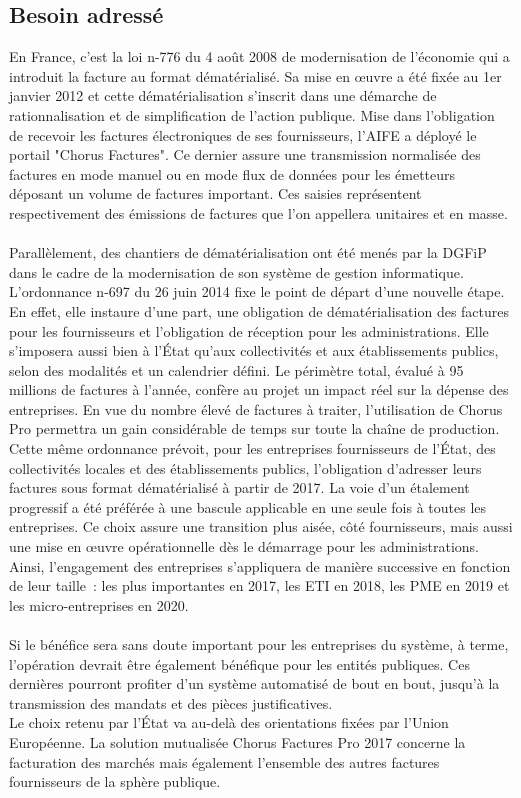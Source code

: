 \documentclass[12pt,a4paper]{article}
\begin{document}
\subsection{Besoin adressé}
En France, c'est la loi n-776 du 4 août 2008 de modernisation de l'économie qui a introduit la facture au format dématérialisé. Sa mise en œuvre a été fixée au 1er janvier 2012 et cette dématérialisation s’inscrit dans une démarche de rationnalisation et de simplification de l’action publique. Mise dans l'obligation de recevoir les factures électroniques de ses fournisseurs, l'AIFE a déployé le portail "Chorus Factures". Ce dernier assure une transmission normalisée des factures en mode manuel ou en mode flux de données pour les émetteurs déposant un volume de factures important. Ces saisies représentent respectivement des émissions de factures que l'on appellera unitaires et en masse.\\\\
Parallèlement, des chantiers de dématérialisation ont été menés par la \gls{DGFiP} dans le cadre de la modernisation de son système de gestion informatique.
L’ordonnance n-697 du 26 juin 2014 fixe le
point de départ d’une nouvelle étape. En effet, elle instaure d'une part, une obligation de dématérialisation des factures pour les fournisseurs et l'obligation de réception pour les administrations. Elle s'imposera aussi bien à l'État qu'aux collectivités et aux établissements publics, selon des modalités et un calendrier défini.
\smallbreak
Le périmètre total, évalué à 95 millions de factures à l'année, confère au projet un impact réel sur la dépense des entreprises. En vue du nombre élevé de factures à traiter, l'utilisation de Chorus Pro permettra un gain considérable de temps sur toute la chaîne de production.
\smallbreak
Cette même ordonnance prévoit, pour les entreprises fournisseurs de l'État, des collectivités locales et des établissements publics, l'obligation d'adresser leurs factures sous format dématérialisé à partir de 2017. La voie d'un étalement progressif a été préférée à une bascule applicable en une seule fois à toutes les entreprises. Ce choix assure une transition plus aisée, côté fournisseurs, mais aussi une mise en œuvre opérationnelle dès le démarrage pour les administrations. Ainsi, l'engagement des entreprises s'appliquera de manière successive en fonction de leur taille~: les plus importantes en 2017, les \gls{ETI} en 2018, les \gls{PME} en 2019 et les micro-entreprises en 2020.\\\\
Si le bénéfice sera sans doute important pour les entreprises du système, à terme, l'opération devrait être également bénéfique pour les entités publiques. Ces dernières pourront profiter d'un système automatisé de bout en bout, jusqu'à la transmission des mandats et des pièces justificatives.\\
Le choix retenu par l'État va au-delà des orientations fixées par l’Union Européenne. La solution mutualisée Chorus Factures Pro 2017 concerne la facturation des marchés mais également l'ensemble des autres factures fournisseurs de la sphère publique.
\newpage
\end{document}
